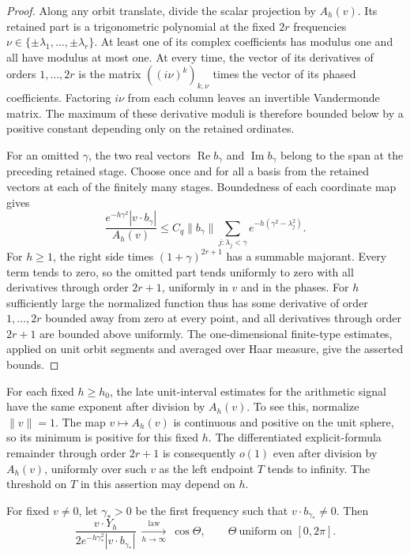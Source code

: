 \begin{proof}
Along any orbit translate, divide the scalar projection by $A_h(v)$.
Its retained part is a trigonometric polynomial at the fixed $2r$
frequencies $\nu\in\{\pm\lambda_1,\ldots,\pm\lambda_r\}$.
At least one of its complex coefficients has modulus one and all
have modulus at most one. At every time, the vector of its derivatives
of orders $1,\ldots,2r$ is the matrix $((i\nu)^k)_{k,\nu}$ times
the vector of its phased coefficients. Factoring $i\nu$ from each column leaves an invertible Vandermonde matrix.
The maximum of these derivative moduli is therefore bounded below
by a positive constant depending only on the retained ordinates.

For an omitted $\gamma$, the two real vectors
$\operatorname{Re}b_\gamma$ and $\operatorname{Im}b_\gamma$ belong
to the span at the preceding retained stage. Choose once and for
all a basis from the retained vectors at each of the finitely many
stages. Boundedness of each coordinate map gives
\[
 \frac{e^{-h\gamma^2}|v\cdot b_\gamma|}{A_h(v)}
 \le C_q\|b_\gamma\|\!
        \sum_{j:\lambda_j<\gamma}
                    e^{-h(\gamma^2-\lambda_j^2)} .
\]
For $h\ge1$, the right side times $(1+\gamma)^{2r+1}$ has a summable
majorant. Every term tends to zero, so the omitted part tends uniformly
to zero with all derivatives through order $2r+1$, uniformly in
$v$ and in the phases. For $h$ sufficiently large the normalized
function thus has some derivative of order $1,\ldots,2r$ bounded
away from zero at every point, and all derivatives through order
$2r+1$ are bounded above uniformly. The one-dimensional finite-type
estimates, applied on unit orbit segments and averaged over Haar
measure, give the asserted bounds.
\end{proof}

For each fixed $h\ge h_0$, the late unit-interval estimates for the
arithmetic signal have the same exponent after division by $A_h(v)$.
To see this, normalize $\|v\|=1$. The map $v\mapsto A_h(v)$ is continuous
and positive on the unit sphere, so its minimum is positive for this
fixed $h$. The differentiated explicit-formula remainder through order
$2r+1$ is consequently $o(1)$ even after division by $A_h(v)$, uniformly
over such $v$ as the left endpoint $T$ tends to infinity. The threshold
on $T$ in this assertion may depend on $h$.

\begin{corollary}
For fixed $v\ne0$, let $\gamma_* >0$ be the first frequency such that
$v\cdot b_{\gamma_*}\ne0$. Then
\[
 \frac{v\cdot Y_h}{2e^{-h\gamma_*^2}|v\cdot b_{\gamma_*}|}
       \ \xrightarrow[h\to\infty]{\mathrm{law}}\ \cos\Theta,\qquad
       \Theta\ \text{uniform on }[0,2\pi].
\]
\end{corollary}

